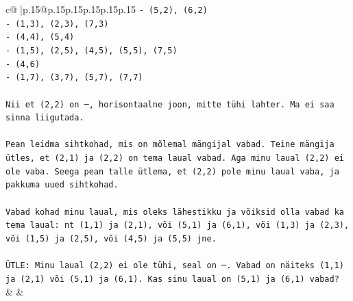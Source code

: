 \documentclass{article}
\begin{document}
{\begin{supertabular}{c@{$\;$}|p{.15\linewidth}@{}p{.15\linewidth}p{.15\linewidth}p{.15\linewidth}p{.15\linewidth}p{.15\linewidth}}
{{{\texttt{{-} (5,2), (6,2)} \\
\texttt{{-} (1,3), (2,3), (7,3)} \\
\texttt{{-} (4,4), (5,4)} \\
\texttt{{-} (1,5), (2,5), (4,5), (5,5), (7,5)} \\
\texttt{{-} (4,6)} \\
\texttt{{-} (1,7), (3,7), (5,7), (7,7)} \\
\\ 
\texttt{Nii et (2,2) on ─, horisontaalne joon, mitte tühi lahter. Ma ei saa sinna liigutada.} \\
\\ 
\texttt{Pean leidma sihtkohad, mis on mõlemal mängijal vabad. Teine mängija ütles, et (2,1) ja (2,2) on tema laual vabad. Aga minu laual (2,2) ei ole vaba. Seega pean talle ütlema, et (2,2) pole minu laual vaba, ja pakkuma uued sihtkohad.} \\
\\ 
\texttt{Vabad kohad minu laual, mis oleks lähestikku ja võiksid olla vabad ka tema laual: nt (1,1) ja (2,1), või (5,1) ja (6,1), või (1,3) ja (2,3), või (1,5) ja (2,5), või (4,5) ja (5,5) jne.} \\
\\ 
\texttt{ÜTLE: Minu laual (2,2) ei ole tühi, seal on ─. Vabad on näiteks (1,1) ja (2,1) või (5,1) ja (6,1). Kas sinu laual on (5,1) ja (6,1) vabad?} \\
            }
        }
    }
    & & \\ \\


\end{supertabular}}
\end{document}
